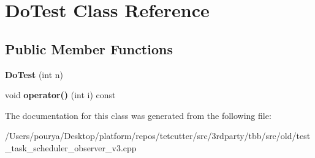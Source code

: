 \hypertarget{classDoTest}{}\section{Do\+Test Class Reference}
\label{classDoTest}
\subsection*{Public Member Functions}
\begin{DoxyCompactItemize}
\item 
\hypertarget{classDoTest_a1a8f0008473d68a19d6ddecd02b740e1}{}{\bfseries Do\+Test} (int n)\label{classDoTest_a1a8f0008473d68a19d6ddecd02b740e1}

\item 
\hypertarget{classDoTest_a0a4aaf3e691099bc18f6d34412f1832e}{}void {\bfseries operator()} (int i) const \label{classDoTest_a0a4aaf3e691099bc18f6d34412f1832e}

\end{DoxyCompactItemize}


The documentation for this class was generated from the following file\+:\begin{DoxyCompactItemize}
\item 
/\+Users/pourya/\+Desktop/platform/repos/tetcutter/src/3rdparty/tbb/src/old/test\+\_\+task\+\_\+scheduler\+\_\+observer\+\_\+v3.\+cpp\end{DoxyCompactItemize}
